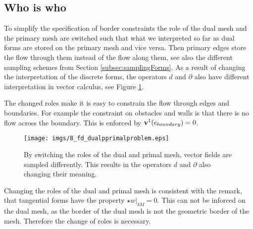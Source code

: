 \subsection{Who is who}
To simplify the specification of border constraints the role of the dual mesh and the primary mesh are switched such that what we interpreted so far as dual forms are stored on the primary mesh and vice versa.  Then primary edges store the flow through them instead of the flow along them, see also the different sampling schemes from Section \ref{subsec:samplingForms}. As a result of changing the interpretation of the discrete forms, the operators $d$ and $\partial$ also have  different interpretation in vector calculus, see Figure \ref{fig:fd_whoiswho}. 

The changed roles make it is easy to constrain the flow through edges and boundaries. For example the constraint on obstacles and walls is that there is no flow across the boundary. This is enforced by $\textbf{v}^1(e_{boundary}) = 0$.

\begin{figure}%
\texttt{[image: imgs/8\_fd\_dualpprimalproblem.eps]}%
\caption{By switching the roles of the dual and primal mesh, vector fields are sampled differently. This results in the operators $d$ and $\partial$ also changing their meaning. }%
\label{fig:fd_whoiswho}%
\end{figure}

Changing the roles of the dual and primal mesh is consistent with the remark, that tangential forms have the property $\star w |_{\delta M} = 0 $. This can not be inforced on the dual mesh, as the border of the dual mesh is not the geometric border of the mesh. Therefore the change of roles is necessary.

